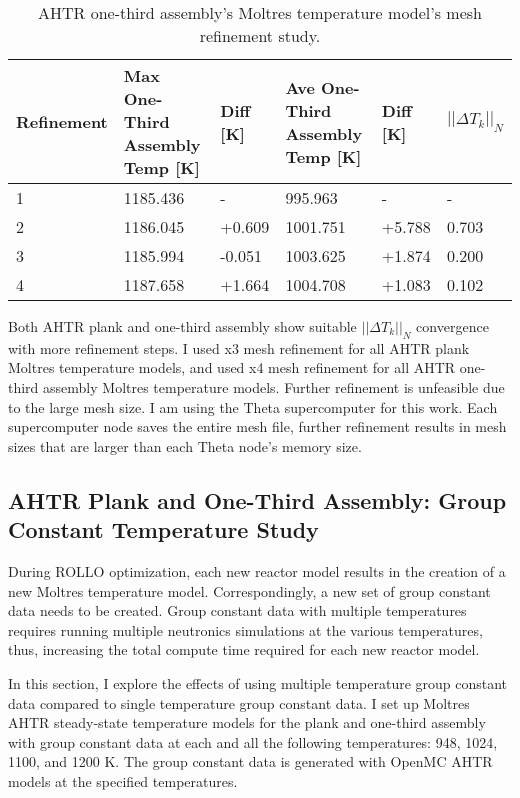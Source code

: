 \begin{table}[htbp]
    \centering
    \onehalfspacing
    \caption{\acrfull{AHTR} one-third assembly's Moltres temperature model's mesh 
    refinement study.}
	\label{tab:ahtr-assem-mesh-refinement}
    \scriptsize
    \begin{tabular}{lp{3.2cm}lp{3.1cm}ll}
    \hline 
    \textbf{Refinement} & \textbf{Max One-Third Assembly Temp [K]} 
    & \textbf{Diff [K]} & \textbf{Ave One-Third Assembly Temp [K]}
    & \textbf{Diff [K]} & $||\Delta T_k||_N$\\ 
    \hline 
    1 & 1185.436 & - & 995.963 & - & - \\
    2 & 1186.045 & +0.609 & 1001.751 & +5.788 & 0.703\\
    3 & 1185.994 & -0.051 & 1003.625 & +1.874 & 0.200\\ 
    4 & 1187.658 & +1.664 & 1004.708 & +1.083 & 0.102\\
    \hline
    \end{tabular}
\end{table}

Both \gls{AHTR} plank and one-third assembly show suitable $||\Delta T_k||_N$ 
convergence with more refinement steps. 
I used x3 mesh refinement for all AHTR plank Moltres temperature models, and 
used x4 mesh refinement for all \gls{AHTR} one-third assembly Moltres temperature 
models. 
Further refinement is unfeasible due to the large mesh size. 
I am using the Theta supercomputer \cite{noauthor_thetathetagpu_nodate} for this work.
Each supercomputer node saves the entire mesh file, further refinement results in 
mesh sizes that are larger than each Theta node's memory size. 

\subsection{AHTR Plank and One-Third Assembly: Group Constant Temperature Study}
During ROLLO optimization, each new reactor model results in the creation of 
a new Moltres temperature model. 
Correspondingly, a new set of group constant data needs to be created. 
Group constant data with multiple temperatures requires running multiple neutronics 
simulations at the various temperatures, thus, increasing the total compute time 
required for each new reactor model. 

In this section, I explore the effects of using multiple temperature group 
constant data compared to single temperature group constant data.
I set up Moltres AHTR steady-state temperature models for the plank and one-third 
assembly with group constant data at each and all the following temperatures: 948, 
1024, 1100, and 1200 K. 
The group constant data is generated with OpenMC \gls{AHTR} models at the specified 
temperatures. 

